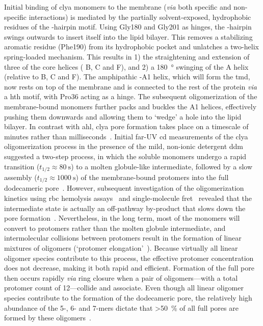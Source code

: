 Initial binding of \gls{clya} monomers to the membrane (\textit{via} both specific and non-specific
interactions) is mediated by the partially solvent-exposed, hydrophobic residues of the \tb-hairpin motif.
Using Gly180 and Gly201 as hinges, the \tb-hairpin swings outwards to insert itself into the lipid bilayer.
This removes a stabilizing aromatic residue (Phe190) from its hydrophobic pocket and unlatches a two-helix
spring-loaded mechanism. This results in 1) the straightening and extension of three of the core helices (\ta
B, \ta C and \ta F), and 2) a \SI{180}{\degree} swinging of the \ta A helix (relative to \ta B, \ta C and \ta
F). The amphipathic \ta-A1 helix, which will form the \gls{tmd}, now rests on top of the membrane and is
connected to the rest of the protein \textit{via} a \gls{hth} motif, with Pro36 acting as a hinge. The
subsequent oligomerization of the membrane-bound monomers further packs and buckles the \ta A1 helices,
effectively pushing them downwards and allowing them to `wedge' a hole into the lipid bilayer. In contrast
with \gls{ahl}, \gls{clya} pore formation takes place on a timescale of minutes rather than
milliseconds~\cite{Benke-2015}. Initial far-UV \gls{cd} measurements of the \gls{clya} oligomerization process
in the presence of the mild, non-ionic detergent \gls{ddm} suggested a two-step process, in which the soluble
monomers undergo a rapid transition ($t_{1/2} \approx \SI{80}{\second}$) to a molten globule-like
intermediate, followed by a slow assembly  ($t_{1/2} \approx \SI{1000}{\second}$) of the membrane-bound
protomers into the full dodecameric pore~\cite{Eifler-2006}. However, subsequent investigation of the
oligomerization kinetics using \gls{rbc} hemolysis assays~\cite{Vaidyanathan-2014} and single-molecule
\gls{fret}~\cite{Benke-2015} revealed that the intermediate state is actually an off-pathway by-product that
slows down the pore formation~\cite{Roderer-2017}. Nevertheless, in the long term, most of the monomers will
convert to protomers rather than the molten globule intermediate, and intermolecular collisions between
protomers result in the formation of linear mixtures of oligomers (`protomer
elongation'~\cite{Roderer-2017}). Because virtually all linear oligomer species contribute to this process,
the effective protomer concentration does not decrease, making it both rapid and efficient. Formation of the
full pore then occurs rapidly \textit{via} ring closure when a pair of oligomers---with a total protomer count
of 12---collide and associate. Even though all linear oligomer species contribute to the formation of the
dodecameric pore, the relatively high abundance of the 5-, 6- and 7-mers dictate that \SI{>50}{\percent} of
all full pores are formed by these oligomers~\cite{Benke-2015}.



